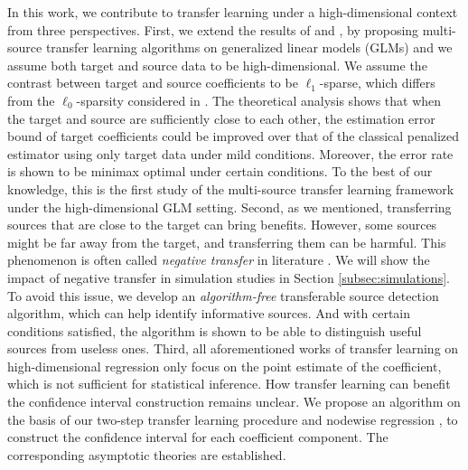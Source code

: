 \documentclass[12pt]{article}
\newcommand{\<}{\langle}
\renewcommand{\>}{\rangle}
\begin{document}
In this work, we contribute to transfer learning under a high-dimensional context from three perspectives. First, we extend the results of \cite{bastani2021predicting} and \cite{li2021transfer}, by proposing multi-source transfer learning algorithms on generalized linear models (GLMs) and we assume both target and source data to be high-dimensional. We assume the contrast between target and source coefficients to be $\ell_1$-sparse, which differs from the $\ell_0$-sparsity considered in \cite{bastani2021predicting}. The theoretical analysis shows that when the target and source are sufficiently close to each other, the estimation error bound of target coefficients could be improved over that of the classical penalized estimator using only target data under mild conditions. Moreover, the error rate is shown to be minimax optimal under certain conditions. To the best of our knowledge, this is the first study of the multi-source transfer learning framework under the high-dimensional GLM setting. Second, as we mentioned, transferring sources that are close to the target can bring benefits. However, some sources might be far away from the target, and transferring them can be harmful. This phenomenon is often called \textit{negative transfer} in literature \citep{torrey2010transfer}. We will show the impact of negative transfer in simulation studies in Section \ref{subsec:simulations}. To avoid this issue, we develop an \textit{algorithm-free} transferable source detection algorithm, which can help identify informative sources. And with certain conditions satisfied, the algorithm is shown to be able to distinguish useful sources from useless ones. Third, all aforementioned works of transfer learning on high-dimensional regression only focus on the point estimate of the coefficient, which is not sufficient for statistical inference. How transfer learning can benefit the confidence interval construction remains unclear. We propose an algorithm on the basis of our two-step transfer learning procedure and nodewise regression \citep{van2014asymptotically}, to construct the confidence interval for each coefficient component. The corresponding asymptotic theories are established. 
 
\end{document}
